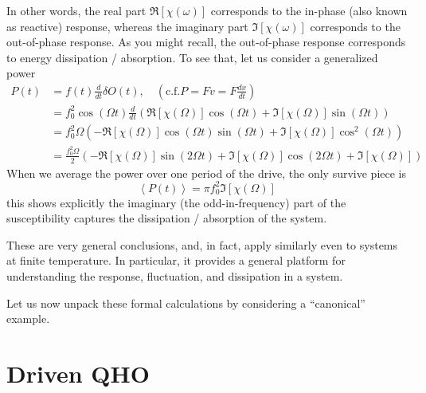 In other words, the real part $\Re[\chi(\omega)]$ corresponds to the in-phase (also known as reactive) response, whereas the imaginary part $\Im[\chi(\omega)]$ corresponds to the out-of-phase response. As you might recall, the out-of-phase response corresponds to energy dissipation / absorption. To see that, let us consider a generalized power
\begin{align*}
    P\left( t \right) &=f\left( t \right) \frac{d}{dt}\delta O\left( t \right) ,\quad \left( \mathrm{c}.\mathrm{f}. P=Fv=F\frac{dx}{dt} \right) \\
    &=f_{0}^{2}\cos \left( \Omega t \right) \frac{d}{dt}\left( \Re \left[ \chi \left( \Omega \right) \right] \cos \left( \Omega t \right) +\Im \left[ \chi \left( \Omega \right) \right] \sin \left( \Omega t \right) \right) \\
    &=f_{0}^{2}\Omega \left( -\Re \left[ \chi \left( \Omega \right) \right] \cos \left( \Omega t \right) \sin \left( \Omega t \right) +\Im \left[ \chi \left( \Omega \right) \right] \cos ^2\left( \Omega t \right) \right) \\
    &=\frac{f_{0}^{2}\Omega}{2}\left( -\Re \left[ \chi \left( \Omega \right) \right] \sin \left( 2\Omega t \right) +\Im \left[ \chi \left( \Omega \right) \right] \cos \left( 2\Omega t \right) +\Im \left[ \chi \left( \Omega \right) \right] \right)
\end{align*}
When we average the power over one period of the drive, the only survive piece is
\[ \left< P\left( t \right) \right> =\pi f_{0}^{2}\Im \left[ \chi \left( \Omega \right) \right] \]
this shows explicitly the imaginary (the odd-in-frequency) part of the susceptibility captures the dissipation / absorption of the system.

These are very general conclusions, and, in fact, apply similarly even to systems at finite temperature. In particular, it provides a general platform for understanding the response, fluctuation, and dissipation in a system.

Let us now unpack these formal calculations by considering a ``canonical'' example.

\section{Driven QHO}

